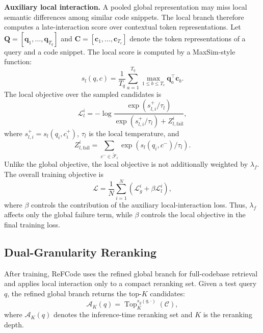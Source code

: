 \documentclass[10pt,conference]{IEEEtran}
\newcommand{\method}{ReFCode}
\begin{document}
\textbf{Auxiliary local interaction.}
A pooled global representation may miss local semantic differences among similar code snippets. The local branch therefore computes a late-interaction score over contextual token representations. Let \(\mathbf{Q}=[\mathbf{q}_1,\ldots,\mathbf{q}_{T_q}]\) and \(\mathbf{C}=[\mathbf{c}_1,\ldots,\mathbf{c}_{T_c}]\) denote the token representations of a query and a code snippet. The local score is computed by a MaxSim-style function:
\begin{equation}
    s_l(q,c)=\frac{1}{T_q}\sum_{a=1}^{T_q}
    \max_{1\leq b\leq T_c}\mathbf{q}_{a}^{\top}\mathbf{c}_{b}.
\end{equation}
The local objective over the sampled candidates is
\begin{equation}
\mathcal{L}_{l}^{i}
= -\log
\frac{\exp(s_{l,i}^{+}/\tau_l)}
{\exp(s_{l,i}^{+}/\tau_l)+Z_{l,\mathrm{fail}}^{i}},
\end{equation}
where \(s_{l,i}^{+}=s_l(q_i,c_i^+)\), \(\tau_l\) is the local temperature, and
\begin{equation}
Z_{l,\mathrm{fail}}^{i}
=
\sum_{c^-\in\widetilde{\mathcal{F}}_i}
\exp(s_l(q_i,c^-)/\tau_l).
\end{equation}
Unlike the global objective, the local objective is not additionally weighted by \(\lambda_f\). The overall training objective is
\begin{equation}
\mathcal{L}
=
\frac{1}{N}\sum_{i=1}^{N}
\left(\mathcal{L}_{g}^{i}+\beta\mathcal{L}_{l}^{i}\right),
\end{equation}
where \(\beta\) controls the contribution of the auxiliary local-interaction loss. Thus, \(\lambda_f\) affects only the global failure term, while \(\beta\) controls the local objective in the final training loss.

\subsection{Dual-Granularity Reranking}
\label{sec:dual_granularity_reranking}

After training, \method{} uses the refined global branch for full-codebase retrieval and applies local interaction only to a compact reranking set. Given a test query \(q\), the refined global branch returns the top-\(K\) candidates:
\begin{equation}
    \mathcal{A}_{K}(q)
    =
    \operatorname{Top}_{K}^{s_g(q,\cdot)}(\mathcal{C}),
\end{equation}
where \(\mathcal{A}_{K}(q)\) denotes the inference-time reranking set and \(K\) is the reranking depth.
\end{document}
